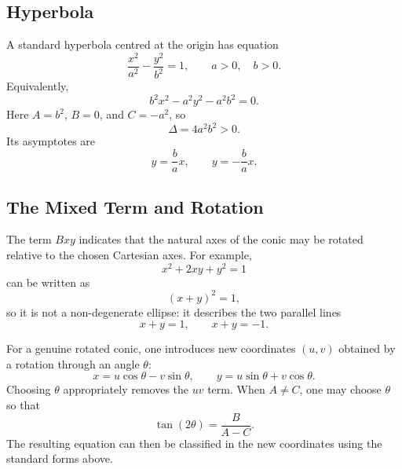 \begin{center}
\end{center}

\subsection{Hyperbola}

A standard hyperbola centred at the origin has equation
\[
\frac{x^2}{a^2}-\frac{y^2}{b^2}=1,
\qquad a>0,\quad b>0.
\]
Equivalently,
\[
b^2x^2-a^2y^2-a^2b^2=0.
\]
Here $A=b^2$, $B=0$, and $C=-a^2$, so
\[
\Delta=4a^2b^2>0.
\]
Its asymptotes are
\[
y=\frac{b}{a}x,
\qquad
y=-\frac{b}{a}x.
\]

\begin{center}
\end{center}

\subsection{The Mixed Term and Rotation}

The term $Bxy$ indicates that the natural axes of the conic may be rotated
relative to the chosen Cartesian axes. For example,
\[
x^2+2xy+y^2=1
\]
can be written as
\[
(x+y)^2=1,
\]
so it is not a non-degenerate ellipse: it describes the two parallel lines
\[
x+y=1,
\qquad
x+y=-1.
\]

For a genuine rotated conic, one introduces new coordinates $(u,v)$ obtained by
a rotation through an angle $\theta$:
\[
x=u\cos\theta-v\sin\theta,
\qquad
y=u\sin\theta+v\cos\theta.
\]
Choosing $\theta$ appropriately removes the $uv$ term. When $A\neq C$, one may
choose $\theta$ so that
\[
\tan(2\theta)=\frac{B}{A-C}.
\]
The resulting equation can then be classified in the new coordinates using the
standard forms above.

